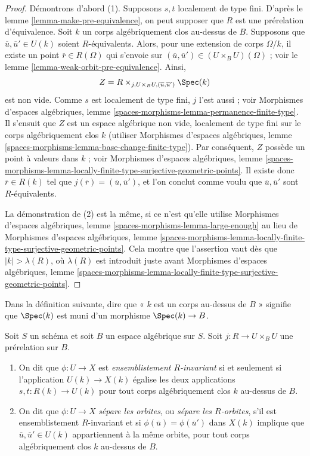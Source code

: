 \begin{proof}
Démontrons d'abord (1). Supposons $s, t$ localement de type fini. D'après le
lemme \ref{lemma-make-pre-equivalence},
on peut supposer que $R$ est une prérelation d'équivalence.
Soit $k$ un corps algébriquement clos au-dessus de $B$.
Supposons que $\overline{u}, \overline{u}' \in U(k)$ soient $R$-équivalents.
Alors, pour une extension de corps $\Omega/k$, il existe
un point $\overline{r} \in R(\Omega)$ qui s'envoie sur
$(\overline{u}, \overline{u}') \in (U \times_B U)(\Omega)$ ; voir le
lemme \ref{lemma-weak-orbit-pre-equivalence}.
Ainsi,
$$
Z = R \times_{j, U \times_B U, (\overline{u}, \overline{u}')} \Spec(k)
$$
est non vide. Comme $s$ est localement de type fini,
$j$ l'est aussi ; voir
Morphismes d'espaces algébriques, lemme \ref{spaces-morphisms-lemma-permanence-finite-type}.
Il s'ensuit que $Z$ est un espace algébrique non vide, localement de type fini
sur le corps algébriquement clos $k$ (utiliser
Morphismes d'espaces algébriques,
lemme \ref{spaces-morphisms-lemma-base-change-finite-type}).
Par conséquent, $Z$ possède un point à valeurs dans $k$ ; voir
Morphismes d'espaces algébriques, lemme
\ref{spaces-morphisms-lemma-locally-finite-type-surjective-geometric-points}.
Il existe donc $\overline{r} \in R(k)$ tel que
$j(\overline{r}) = (\overline{u}, \overline{u}')$, et l'on conclut comme voulu que
$\overline{u}, \overline{u}'$ sont $R$-équivalents.

\medskip\noindent
La démonstration de (2) est la même, si ce n'est qu'elle utilise
Morphismes d'espaces algébriques, lemme
\ref{spaces-morphisms-lemma-large-enough}
au lieu de
Morphismes d'espaces algébriques, lemme
\ref{spaces-morphisms-lemma-locally-finite-type-surjective-geometric-points}.
Cela montre que l'assertion vaut dès que $|k| > \lambda(R)$, où
$\lambda(R)$ est introduit juste avant
Morphismes d'espaces algébriques, lemme
\ref{spaces-morphisms-lemma-locally-finite-type-surjective-geometric-points}.
\end{proof}

\noindent
Dans la définition suivante, dire que « $k$ est un corps
au-dessus de $B$ » signifie que $\Spec(k)$ est muni d'un morphisme
$\Spec(k) \to B$.

\begin{definition}
\label{definition-set-theoretically-invariant}
Soit $S$ un schéma et soit $B$ un espace algébrique sur $S$.
Soit $j : R \to U \times_B U$ une prérelation sur $B$.
\begin{enumerate}
\item On dit que $\phi : U \to X$ est {\it ensemblistement $R$-invariant}
si et seulement si l'application $U(k) \to X(k)$ égalise les deux applications
$s, t : R(k) \to U(k)$ pour tout corps algébriquement clos $k$
au-dessus de $B$.
\item On dit que $\phi : U \to X$ {\it sépare les orbites}, ou
{\it sépare les $R$-orbites}, s'il est ensemblistement $R$-invariant et si
$\phi(\overline{u}) = \phi(\overline{u}')$ dans $X(k)$ implique que
$\overline{u}, \overline{u}' \in U(k)$ appartiennent à la même orbite,
pour tout corps algébriquement clos $k$ au-dessus de $B$.
\end{enumerate}
\end{definition}

